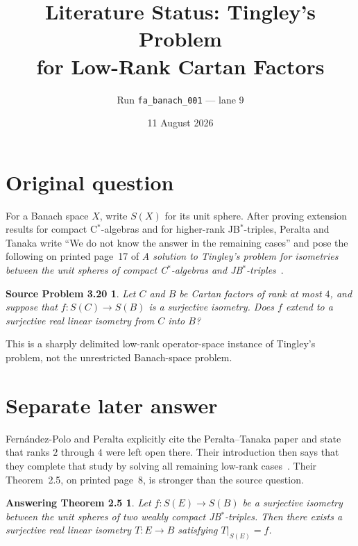 \documentclass[11pt]{article}
\title{Literature Status: Tingley's Problem\\
for Low-Rank Cartan Factors}
\author{Run \texttt{fa\_banach\_001} --- lane 9}
\date{11 August 2026}
\newtheorem*{question}{Source Problem 3.20}
\newtheorem*{answer}{Answering Theorem 2.5}
\begin{document}
\maketitle

\begin{center}
\end{center}

\section{Original question}

For a Banach space $X$, write $S(X)$ for its unit sphere.  After proving
extension results for compact C$^*$-algebras and for higher-rank
JB$^*$-triples, Peralta and Tanaka write ``We do not know the answer in
the remaining cases'' and pose the following on printed page~17 of
\emph{A solution to Tingley's problem for isometries between the unit
spheres of compact C$^*$-algebras and JB$^*$-triples}~\cite{source}.

\begin{question}
Let $C$ and $B$ be Cartan factors of rank at most $4$, and suppose that
$f:S(C)\to S(B)$ is a surjective isometry.  Does $f$ extend to a
surjective real linear isometry from $C$ into $B$?
\end{question}

This is a sharply delimited low-rank operator-space instance of Tingley's
problem, not the unrestricted Banach-space problem.

\section{Separate later answer}

Fern\'andez-Polo and Peralta explicitly cite the Peralta--Tanaka paper and
state that ranks $2$ through $4$ were left open there.  Their introduction
then says that they complete that study by solving all remaining low-rank
cases~\cite{answerpaper}.  Their Theorem~2.5, on printed page~8, is stronger
than the source question.

\begin{answer}
Let $f:S(E)\to S(B)$ be a surjective isometry between the unit spheres of
two weakly compact JB$^*$-triples.  Then there exists a surjective real
linear isometry $T:E\to B$ satisfying $T|_{S(E)}=f$.
\end{answer}
\end{document}
